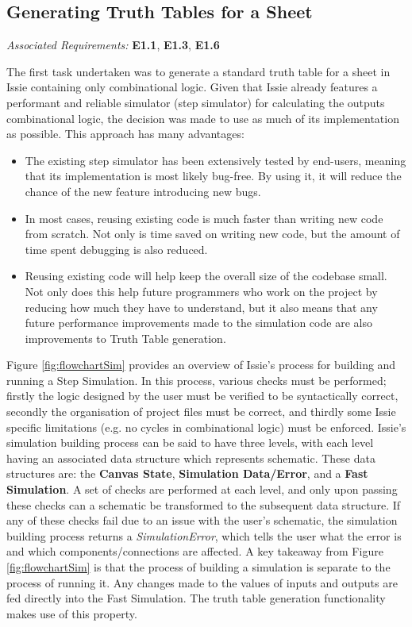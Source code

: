 \subsection{Generating Truth Tables for a Sheet}
\emph{Associated Requirements:} \textbf{E1.1}, \textbf{E1.3}, \textbf{E1.6}

The first task undertaken was to generate a standard truth table for a sheet in Issie containing only combinational logic. Given that Issie already features a performant and reliable simulator (step simulator) for calculating the outputs combinational logic, the decision was made to use as much of its implementation as possible. This approach has many advantages:
\begin{itemize}
    \item The existing step simulator has been extensively tested by end-users, meaning that its implementation is most likely bug-free. By using it, it will reduce the chance of the new feature introducing new bugs.
    \item In most cases, reusing existing code is much faster than writing new code from scratch. Not only is time saved on writing new code, but the amount of time spent debugging is also reduced.
    \item Reusing existing code will help keep the overall size of the codebase small. Not only does this help future programmers who work on the project by reducing how much they have to understand, but it also means that any future performance improvements made to the simulation code are also improvements to Truth Table generation.
\end{itemize}

Figure \ref{fig:flowchartSim} provides an overview of Issie's process for building and running a Step Simulation. In this process, various checks must be performed; firstly the logic designed by the user must be verified to be syntactically correct, secondly the organisation of project files must be correct, and thirdly some Issie specific limitations (e.g. no cycles in combinational logic) must be enforced. Issie's simulation building process can be said to have three levels, with each level having an associated data structure which represents schematic. These data structures are: the \textbf{Canvas State}, \textbf{Simulation Data/Error}, and a \textbf{Fast Simulation}. A set of checks are performed at each level, and only upon passing these checks can a schematic be transformed to the subsequent data structure.
If any of these checks fail due to an issue with the user's schematic, the simulation building process returns a \textit{SimulationError}, which tells the user what the error is and which components/connections are affected. A key takeaway from Figure \ref{fig:flowchartSim} is that the process of building a simulation is separate to the process of running it. Any changes made to the values of inputs and outputs are fed directly into the Fast Simulation. The truth table generation functionality makes use of this property.

